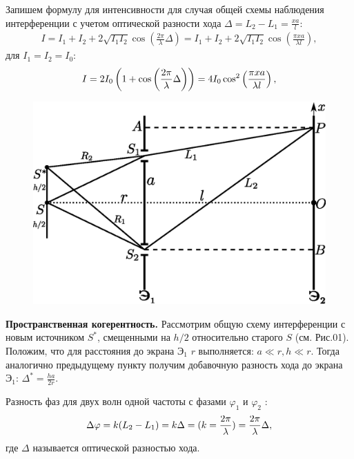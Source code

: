 ﻿\documentclass[__main__.tex]{subfiles}
\begin{document}
Запишем формулу для интенсивности для случая общей схемы наблюдения интерференции с учетом оптической разности хода $\displaystyle \Delta = L_2 - L_1 = \frac{xa}{l}$:
\begin{gather*}
I = I_1 + I_2 + 2\sqrt{I_1 I_2}\cos\left(\frac{2\pi}{\lambda}\Delta\right) =
I_1 + I_2 + 2\sqrt{I_1 I_2}\cos\left(\frac{\pi x a}{\lambda l}\right),
\end{gather*}
для $I_1 = I_2 = I_0$:
\begin{gather}
\llabel{o-02-intensesch}
I = 2I_0\left(1 + \cos\left(\frac{2\pi}{\lambda}\Delta\right)\right) =
4I_0\cos^2\left(\frac{\pi xa}{\lambda l}\right),
\end{gather}

\begin{figure}
	\includegraphics[width=1\linewidth]{img/o-09}{}
	\caption{}
\end{figure}

\textbf{Пространственная когерентность.}
Рассмотрим общую схему интерференции с новым источником $S^*$, смещенными на $h/2$ относительно старого $S$ (см. Рис.01). Положим, что для расстояния до экрана $\text{Э}_1$ $r$ выполняется: $a\ll r, h\ll r$. Тогда аналогично предыдущему пункту получим добавочную разность хода до экрана $\text{Э}_1$: $\Delta^* = \frac{ha}{2r}$. 


Разность фаз для двух волн одной частоты с фазами $\varphi_1$ и $\varphi_2$ :
\begin{gather}
\llabel{o-02-phasediff}
\Delta \varphi = k(L_2 - L_1) = k \Delta =
(k = \frac{2\pi}{\lambda}) =
\frac{2\pi}{\lambda}\Delta,
\end{gather}
где $\Delta$ называется оптической разностью хода. 
\end{document}
